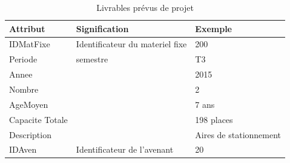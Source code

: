 \documentclass[a4paper]{report}
\begin{document}
\begin{doublespace}
	\begin{table}[H]
		\begin{center}
			\begin{tabularx}{17.5cm}{|X|X|X|}
				\hline
				\textbf{Attribut} & \textbf{Signification}          &
				\textbf{Exemple}                                                             \\
				\hline
				IDMatFixe         & Identificateur du materiel fixe & 200                    \\
				\hline
				Periode           & semestre                        & T3                     \\
				\hline
				Annee             &                                 & 2015                   \\
				\hline
				Nombre            &                                 & 2                      \\
				\hline
				AgeMoyen          &                                 & 7 ans                  \\
				\hline
				Capacite Totale   &                                 & 198 places             \\
				\hline
				Description       &                                 & Aires de stationnement \\
				\hline
				IDAven            & Identificateur de l'avenant     & 20                     \\
				\hline
			\end{tabularx}
			\caption{Livrables prévus de projet}
		\end{center}
	\end{table}
	

\end{doublespace}
\end{document}
